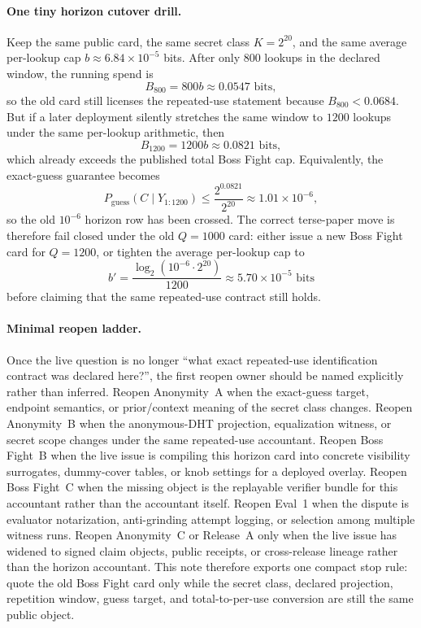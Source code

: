 \documentclass[11pt]{article}
\newcommand{\logtwo}{\log_2}
\begin{document}
\paragraph{One tiny horizon cutover drill.}
Keep the same public card, the same secret class $K=2^{20}$, and the same average per-lookup cap $b\approx 6.84\times 10^{-5}$ bits.
After only $800$ lookups in the declared window, the running spend is
\[
B_{800}=800b\approx 0.0547\text{ bits},
\]
so the old card still licenses the repeated-use statement because $B_{800}<0.0684$.
But if a later deployment silently stretches the same window to $1200$ lookups under the same per-lookup arithmetic, then
\[
B_{1200}=1200b\approx 0.0821\text{ bits},
\]
which already exceeds the published total Boss Fight cap.
Equivalently, the exact-guess guarantee becomes
\[
P_{\mathrm{guess}}(C\mid Y_{1:1200}) \le \frac{2^{0.0821}}{2^{20}} \approx 1.01\times 10^{-6},
\]
so the old $10^{-6}$ horizon row has been crossed.
The correct terse-paper move is therefore fail closed under the old $Q=1000$ card: either issue a new Boss Fight card for $Q=1200$, or tighten the average per-lookup cap to
\[
b' = \frac{\logtwo(10^{-6}\cdot 2^{20})}{1200} \approx 5.70\times 10^{-5}\text{ bits}
\]
before claiming that the same repeated-use contract still holds.

\paragraph{Minimal reopen ladder.}
Once the live question is no longer ``what exact repeated-use identification contract was declared here?'', the first reopen owner should be named explicitly rather than inferred.
Reopen Anonymity~A when the exact-guess target, endpoint semantics, or prior/context meaning of the secret class changes.
Reopen Anonymity~B when the anonymous-DHT projection, equalization witness, or secret scope changes under the same repeated-use accountant.
Reopen Boss Fight~B when the live issue is compiling this horizon card into concrete visibility surrogates, dummy-cover tables, or knob settings for a deployed overlay.
Reopen Boss Fight~C when the missing object is the replayable verifier bundle for this accountant rather than the accountant itself.
Reopen Eval~1 when the dispute is evaluator notarization, anti-grinding attempt logging, or selection among multiple witness runs.
Reopen Anonymity~C or Release~A only when the live issue has widened to signed claim objects, public receipts, or cross-release lineage rather than the horizon accountant.
This note therefore exports one compact stop rule: quote the old Boss Fight card only while the secret class, declared projection, repetition window, guess target, and total-to-per-use conversion are still the same public object.\cite{series:oddsinflation,series:profiling,series:bossfightB,series:bossfightC,series:evalnotary,series:abomoinl,series:releaseproperty}
\end{document}
